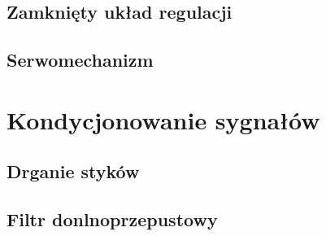 \subsection{Zamknięty układ regulacji}
\subsection{Serwomechanizm}
\section{Kondycjonowanie sygnałów}
\subsection{Drganie styków}
\subsection{Filtr donlnoprzepustowy}
